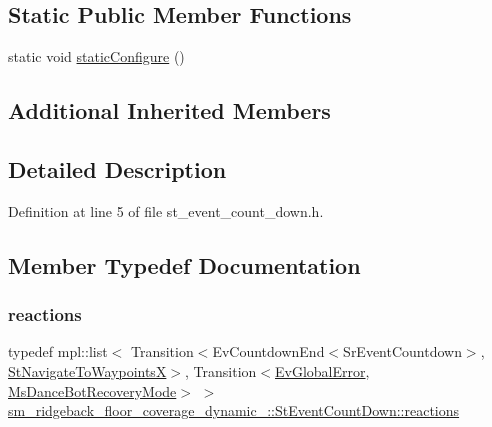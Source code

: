 \subsection*{Static Public Member Functions}
\begin{DoxyCompactItemize}
\item 
static void \hyperlink{structsm__ridgeback__floor__coverage__dynamic__1_1_1StEventCountDown_aacf7e164a0dfb240918ff737fd61570d}{static\+Configure} ()
\end{DoxyCompactItemize}
\subsection*{Additional Inherited Members}


\subsection{Detailed Description}


Definition at line 5 of file st\+\_\+event\+\_\+count\+\_\+down.\+h.



\subsection{Member Typedef Documentation}
\mbox{\label{structsm__ridgeback__floor__coverage__dynamic__1_1_1StEventCountDown_afe82e1a76bd4a327fbbfcbff20224557}} 
\subsubsection{\texorpdfstring{reactions}{reactions}}
{\footnotesize\ttfamily typedef mpl\+::list$<$ Transition$<$Ev\+Countdown\+End$<$Sr\+Event\+Countdown$>$, \hyperlink{structsm__ridgeback__floor__coverage__dynamic__1_1_1StNavigateToWaypointsX}{St\+Navigate\+To\+WaypointsX}$>$, Transition$<$\hyperlink{structsm__ridgeback__floor__coverage__dynamic__1_1_1EvGlobalError}{Ev\+Global\+Error}, \hyperlink{classsm__ridgeback__floor__coverage__dynamic__1_1_1MsDanceBotRecoveryMode}{Ms\+Dance\+Bot\+Recovery\+Mode}$>$ $>$ \hyperlink{structsm__ridgeback__floor__coverage__dynamic__1_1_1StEventCountDown_afe82e1a76bd4a327fbbfcbff20224557}{sm\+\_\+ridgeback\+\_\+floor\+\_\+coverage\+\_\+dynamic\+\_\+::\+St\+Event\+Count\+Down\+::reactions}}



